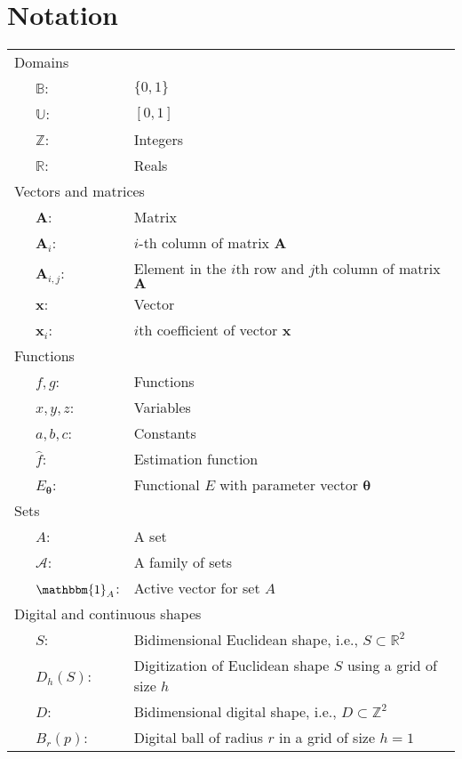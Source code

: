 \chapter{Notation}
\label{chapter:notation}

\begin{longtable}{p{1cm}ll}
\multicolumn{3}{l}{Domains}\\
& $\mathbb{B}$: & $\{0,1\}$\\\
& $\mathbb{U}$: & $[0,1]$\\
& $\mathbb{Z}$: & Integers\\
& $\mathbb{R}$: & Reals\\[1em]

\multicolumn{3}{l}{Vectors and matrices}\\
& $\mathbf{A}$: & Matrix\\
& $\mathbf{A}_i$: & $i$-th column of matrix $\mathbf{A}$\\
& $\mathbf{A}_{i,j}$: & Element in the $i$th row and $j$th column of matrix $\mathbf{A}$\\
& $\mathbf{x}$: & Vector\\
& $\mathbf{x}_i$: & $i$th coefficient of vector $\mathbf{x}$\\[1em]

\multicolumn{3}{l}{Functions}\\
& $f,g$: & Functions\\
& $x,y,z$: & Variables \\
& $a,b,c$: & Constants \\
& $\hat{f}$: & Estimation function\\
& $E_{\boldsymbol{\theta}}$: & Functional $E$  with parameter vector $\boldsymbol{\theta}$ \\[1em]

\multicolumn{3}{l}{Sets}\\
& $A$: & A set\\
& $\mathcal{A}$: & A family of sets\\
& $\mathbbm{1}_A$: & Active vector for set $A$\\[1em]


\multicolumn{3}{l}{Digital and continuous shapes}\\
& $S$: & Bidimensional Euclidean shape, i.e.,  $S \subset \mathbb{R}^2$\\
& $D_h(S)$: & Digitization of Euclidean shape $S$  using a grid of size $h$\\
& $D$: & Bidimensional digital shape, i.e., $D \subset \mathbb{Z}^2$\\
& $B_r(p)$: & Digital ball of radius $r$  in a grid of size $h=1$ \\[1em]


\end{longtable}
